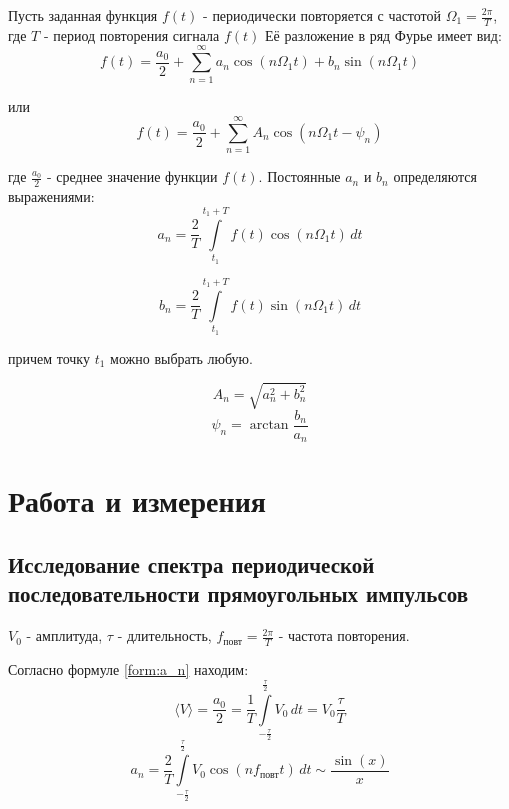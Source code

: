 \documentclass[a4paper, 12pt]{article}
\begin{document}
Пусть заданная функция $f(t)$ - периодически повторяется с частотой $\Omega_{1}=\frac{2\pi}{T}$, где $T$ - период повторения сигнала $f(t)$
Её разложение в ряд Фурье имеет вид:
\begin{equation}
\label{form:furie}	
	f(t)=\frac{a_{0}}{2}+\sum\limits_{n=1}^{\infty}a_{n}\cos(n\Omega_{1}t)+b_{n}\sin(n\Omega_{1}t) 
\end{equation}

или
\begin{equation}
	f(t)=\frac{a_{0}}{2}+\sum\limits_{n=1}^{\infty}A_{n}\cos(n\Omega_{1}t-\psi_{n}) 
\label{form:furie_2}
\end{equation}

где $\frac{a_{0}}{2}$ - среднее значение функции $f(t)$. Постоянные $a_n$ и $b_n$ определяются выражениями:
\begin{equation}
\label{form:a_n}
	a_{n} = \frac{2}{T}\int\limits_{t_{1}}^{t_{1}+T}f(t)\cos(n\Omega_1t)\, dt
\end{equation}

\begin{equation}
	b_{n} = \frac{2}{T}\int\limits_{t_{1}}^{t_{1}+T}f(t)\sin(n\Omega_{1}t)\, dt 
\label{form:b_n}
\end{equation}

причем точку $t_{1}$ можно выбрать любую.

\begin{equation}
\label{form:A_n}
	A_{n} = \sqrt{a_{n}^2+b_{n}^2}
\end{equation}
\begin{equation}
	\psi_{n} = \arctan\frac{b_{n}}{a_{n}}
\label{form:psi_n}
\end{equation}
\section{Работа и измерения}
\subsection*{Исследование спектра периодической последовательности прямоугольных импульсов}

$V_0$  - амплитуда, $\tau$ - длительность, $f_\text{повт} = \frac{2\pi}{T} $ - частота повторения.

Согласно формуле \ref{form:a_n} находим:
$$ \langle V \rangle = \frac{a_0}{2} =  \frac{1}{T}\int\limits_{ -\frac{\tau}{2} } ^ {\frac{\tau}{2} } V_0\,dt = V_0 \frac{\tau}{T}
$$
\begin{equation}
\label{form:app_a_n}
	a_n = \frac{2}{T}\int\limits_{ -\frac{\tau}{2} } ^ {\frac{\tau}{2} } V_0\cos(nf_\text{повт}t)\, dt \sim \frac{\sin(x)}{x}
\end{equation}
 
\end{document}
